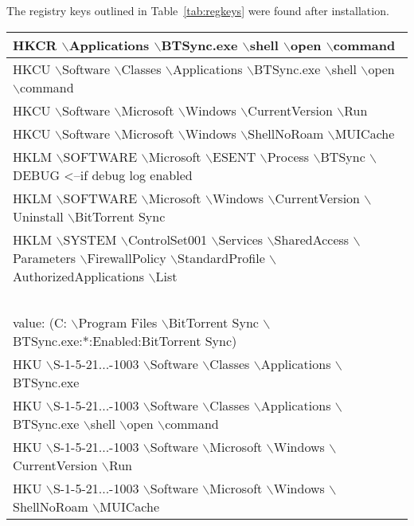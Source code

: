\documentclass[final,5p,times,twocolumn]{elsarticle}
\begin{document}
 The registry keys outlined in Table~\ref{tab:regkeys} were found after installation.
\begin{table}[h]
\begin{tabular}{|>{\raggedright\arraybackslash}p{8.5cm}|}

\hline
    HKCR $\backslash$Applications  $\backslash$BTSync.exe $\backslash$shell $\backslash$open $\backslash$command                         \\ \hline
    HKCU $\backslash$Software $\backslash$Classes $\backslash$Applications $\backslash$BTSync.exe $\backslash$shell $\backslash$open $\backslash$command \\ \hline
    HKCU $\backslash$Software $\backslash$Microsoft $\backslash$Windows $\backslash$CurrentVersion $\backslash$Run                      \\ \hline
    HKCU $\backslash$Software $\backslash$Microsoft $\backslash$Windows $\backslash$ShellNoRoam $\backslash$MUICache                    \\ \hline
    HKLM $\backslash$SOFTWARE $\backslash$Microsoft $\backslash$ESENT $\backslash$Process $\backslash$BTSync $\backslash$DEBUG <--if debug log enabled \\ \hline
    HKLM $\backslash$SOFTWARE $\backslash$Microsoft $\backslash$Windows $\backslash$CurrentVersion $\backslash$Uninstall $\backslash$BitTorrent Sync \\ \hline
    HKLM $\backslash$SYSTEM $\backslash$ControlSet001 $\backslash$Services $\backslash$SharedAccess $\backslash$Parameters $\backslash$FirewallPolicy $\backslash$StandardProfile $\backslash$AuthorizedApplications $\backslash$List \\ ~ \\value: (C: $\backslash$Program Files $\backslash$BitTorrent Sync $\backslash$BTSync.exe:*:Enabled:BitTorrent Sync)                           \\ \hline
    HKU $\backslash$S-1-5-21...-1003 $\backslash$Software $\backslash$Classes $\backslash$Applications $\backslash$BTSync.exe \\ \hline
    HKU $\backslash$S-1-5-21...-1003 $\backslash$Software $\backslash$Classes $\backslash$Applications $\backslash$BTSync.exe $\backslash$shell $\backslash$open $\backslash$command \\ \hline
    HKU $\backslash$S-1-5-21...-1003 $\backslash$Software $\backslash$Microsoft $\backslash$Windows $\backslash$CurrentVersion $\backslash$Run \\ \hline
    HKU $\backslash$S-1-5-21...-1003 $\backslash$Software $\backslash$Microsoft $\backslash$Windows $\backslash$ShellNoRoam $\backslash$MUICache \\ \hline

\end{tabular}
\end{table}
\end{document}
